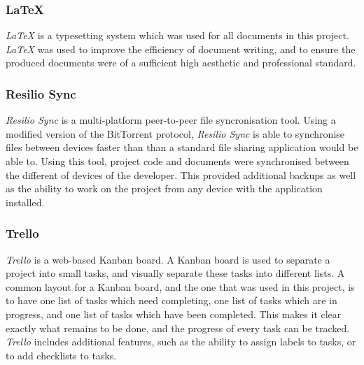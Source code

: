 \subsubsection{LaTeX \cite{latex}}
\textit{LaTeX} is a typesetting system which was used for all documents in this project. \textit{LaTeX} was used to improve the efficiency of document writing, and to ensure the produced documents were of a sufficient high aesthetic and professional standard.

\subsubsection{Resilio Sync \cite{resilio_sync}}
\textit{Resilio Sync} is a multi-platform peer-to-peer file syncronisation tool. Using a modified version of the BitTorrent protocol, \textit{Resilio Sync} is able to synchronise files between devices faster than than a standard file sharing application would be able to. Using this tool, project code and documents were synchronised between the different of devices of the developer. This provided additional backups as well as the ability to work on the project from any device with the application installed.

\subsubsection{Trello \cite{trello}}
\textit{Trello} is a web-based Kanban board. A Kanban board is used to separate a project into small tasks, and visually separate these tasks into different lists. A common layout for a Kanban board, and the one that was used in this project, is to have one list of tasks which need completing, one list of tasks which are in progress, and one list of tasks which have been completed. This makes it clear exactly what remains to be done, and the progress of every task can be tracked. \textit{Trello} includes additional features, such as the ability to assign labels to tasks, or to add checklists to tasks.


